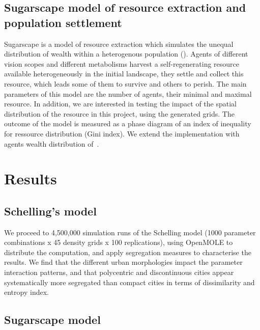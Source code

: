 \documentclass[Afour,sageh,times]{sagej}
\begin{document}
\subsection{Sugarscape model of resource extraction and population settlement}

Sugarscape is a model of resource extraction which simulates the unequal distribution of wealth within a heterogenous population (\cite{EpsteinAxtell1996}). Agents of different vision scopes and different metabolisms harvest a self-regenerating resource available heterogeneously in the initial landscape, they settle and collect this resource, which leads some of them to survive and others to perish. The main parameters of this model are the number of agents, their minimal and maximal resource. In addition, we are interested in testing the impact of the spatial distribution of the resource in this project, using the generated grids. The outcome of the model is measured as a phase diagram of an index of inequality for ressource distribution (Gini index). We extend the implementation with agents wealth distribution of~\cite{li2009netlogo}.


\section{Results}



\subsection{Schelling's model}

We proceed to 4,500,000 simulation runs of the Schelling model (1000 parameter combinations x 45 density grids x 100 replications), using OpenMOLE to distribute the computation, and apply segregation measures to characterise the results. We find that the different urban morphologies impact the parameter interaction patterns, and that polycentric and discontinuous cities appear systematically more segregated than compact cities in terms of dissimilarity and entropy index.

\subsection{Sugarscape model}
\end{document}
